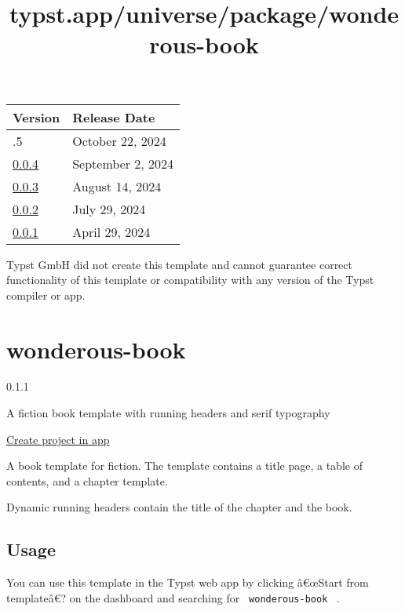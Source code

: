 \begin{longtable}[]{@{}ll@{}}
\toprule\noalign{}
Version & Release Date \\
\midrule\noalign{}
\endhead
\bottomrule\noalign{}
\endlastfoot
0.0.5 & October 22, 2024 \\
\href{https://typst.app/universe/package/modernpro-coverletter/0.0.4/}{0.0.4}
& September 2, 2024 \\
\href{https://typst.app/universe/package/modernpro-coverletter/0.0.3/}{0.0.3}
& August 14, 2024 \\
\href{https://typst.app/universe/package/modernpro-coverletter/0.0.2/}{0.0.2}
& July 29, 2024 \\
\href{https://typst.app/universe/package/modernpro-coverletter/0.0.1/}{0.0.1}
& April 29, 2024 \\
\end{longtable}

Typst GmbH did not create this template and cannot guarantee correct
functionality of this template or compatibility with any version of the
Typst compiler or app.


\title{typst.app/universe/package/wonderous-book}

\label{banner}
\label{template-thumbnail}

\section{wonderous-book}\label{wonderous-book}

{ 0.1.1 }

A fiction book template with running headers and serif typography

\href{/app?template=wonderous-book&version=0.1.1}{Create project in app}

\label{readme}
A book template for fiction. The template contains a title page, a table
of contents, and a chapter template.

Dynamic running headers contain the title of the chapter and the book.

\subsection{Usage}\label{usage}

You can use this template in the Typst web app by clicking â€œStart from
templateâ€? on the dashboard and searching for
\texttt{\ wonderous-book\ } .

